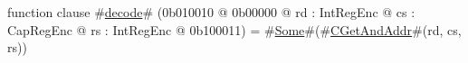 function clause #\hyperref[sailMIPSzdecode]{decode}# (0b010010 @ 0b00000 @ rd : IntRegEnc @ cs : CapRegEnc @ rs : IntRegEnc @ 0b100011) = #\hyperref[sailMIPSzSome]{Some}#(#\hyperref[sailMIPSzCGetAndAddr]{CGetAndAddr}#(rd, cs, rs))
